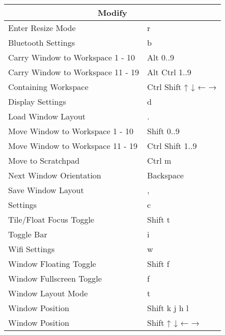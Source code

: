 \documentclass[12pt,paper=portrait,paper=a4]{scrartcl}
\begin{document}
    \begin{tabular}{ll}
         \multicolumn{2}{c}{Modify}\\
         \hline
         Enter Resize Mode                  & \faWindows{} r\\
         Bluetooth Settings                 & \faWindows{} b\\
         Carry Window to Workspace 1 - 10   & \faWindows{} Alt 0..9\\
         Carry Window to Workspace 11 - 19  & \faWindows{} Alt Ctrl 1..9\\
         Containing Workspace               & \faWindows{} Ctrl Shift ↑ ↓ ← →\\
         Display Settings                   & \faWindows{} d\\
         Load Window Layout                 & \faWindows{} .\\
         Move Window to Workspace 1 - 10    & \faWindows{} Shift 0..9\\
         Move Window to Workspace 11 - 19   & \faWindows{} Ctrl Shift 1..9\\
         Move to Scratchpad                 & \faWindows{} Ctrl m\\
         Next Window Orientation            & \faWindows{} Backspace\\
         Save Window Layout                 & \faWindows{} ,\\
         Settings                           & \faWindows{} c\\
         Tile/Float Focus Toggle            & \faWindows{} Shift t\\
         Toggle Bar                         & \faWindows{} i\\
         Wifi Settings                      & \faWindows{} w\\
         Window Floating Toggle             & \faWindows{} Shift f\\
         Window Fullscreen Toggle           & \faWindows{} f\\
         Window Layout Mode                 & \faWindows{} t\\
         Window Position                    & \faWindows{} Shift k j h l\\
         Window Position                    & \faWindows{} Shift ↑ ↓ ← →
     \end{tabular}
\end{document}

